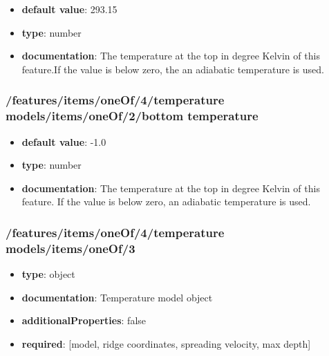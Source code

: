 \begin{itemize}\item {\bf default value}: 293.15
\item {\bf type}: number
\item {\bf documentation}: The temperature at the top in degree Kelvin of this feature.If the value is below zero, the an adiabatic temperature is used.
\end{itemize}\subsubsection{/features/items/oneOf/4/temperature models/items/oneOf/2/bottom temperature}
\begin{itemize}\item {\bf default value}: -1.0
\item {\bf type}: number
\item {\bf documentation}: The temperature at the top in degree Kelvin of this feature. If the value is below zero, an adiabatic temperature is used.
\end{itemize}\subsubsection{/features/items/oneOf/4/temperature models/items/oneOf/3}
\begin{itemize}\item {\bf type}: object
\item {\bf documentation}: Temperature model object
\item {\bf additionalProperties}: false
\item {\bf required}: [model, ridge coordinates, spreading velocity, max depth]\end{itemize}
